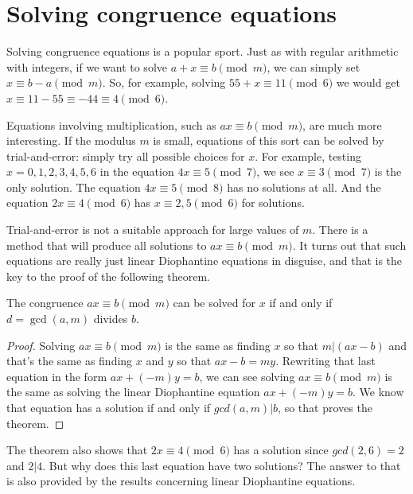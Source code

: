 \section{Solving congruence equations}
Solving congruence equations is a popular sport.
Just as with regular arithmetic with integers, if we want to solve $a+x\equiv b\pmod m$, 
we can simply set $x\equiv b-a \pmod m$. So, for example, solving 
$55+x\equiv 11 \pmod 6$ we would get $x \equiv 11-55\equiv -44 \equiv 4 \pmod 6$.
  
Equations involving multiplication, such as  $ax\equiv b\pmod m$, are much more 
interesting.
If the modulus $m$ is small, equations of this sort can be solved by trial-and-error:
simply try all possible choices for $x$. For example, testing $x=0,1,2,3,4,5,6$
in the equation $4x\equiv 5 \pmod 7$, we see $x\equiv 3 \pmod 7$ is the only solution.
The equation $4x \equiv 5 \pmod 8$ has no solutions at all. And the equation
$2x\equiv 4\pmod 6$ has $x\equiv 2,5 \pmod 6$ for solutions.

Trial-and-error is not a suitable approach for large values of $m$. There is a method
that will produce all solutions to $ax\equiv b \pmod m$.   It turns out that such
equations are really just linear Diophantine equations in disguise, and that is the 
key to the proof of the following theorem. 

\begin{thm}%
%
 The congruence $ax\equiv b\pmod m$ can be solved for 
 $x$ if and only if $d=\gcd(a,m)$ divides $b$.
\end{thm}%
\begin{proof}
 Solving $ax\equiv b\pmod m$ is the same as finding $x$
 so that $m | (ax-b)$ and that's the same as finding $x$ and $y$ so that
 $ax-b = my$. Rewriting that last equation in the form $ax+(-m)y = b$,
 we can see solving $ax\equiv b\pmod m$ is the same as solving the 
 linear Diophantine equation $ax + (-m)y = b$. We know that
 equation has a solution if and only if $gcd(a,m) | b$, so that proves the
 theorem.
\end{proof}
 

The theorem also shows that $2x\equiv 4\pmod 6$  has a solution
since $gcd(2,6)=2$ and $2 | 4$. But why does this last equation have two
solutions? The answer to that is also provided by the results concerning
linear Diophantine equations.


